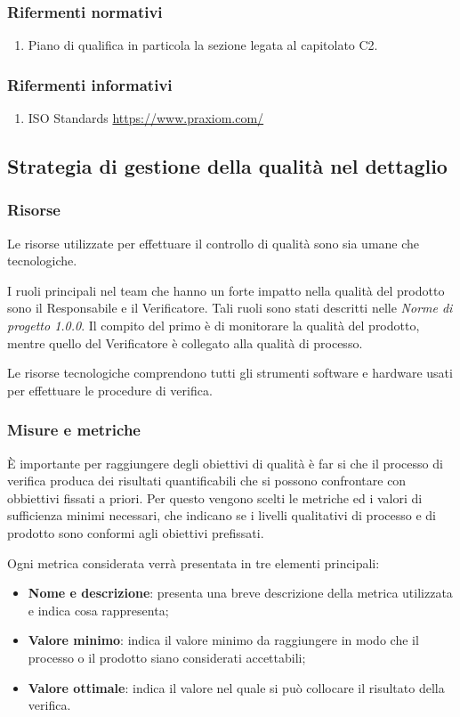 \subsubsection{Rifermenti normativi}
\begin{enumerate}
  \item Piano di qualifica in particola la sezione legata al capitolato C2.
\end{enumerate}
\subsubsection{Rifermenti informativi}
\begin{enumerate}
  \item ISO Standards
	\url{https://www.praxiom.com/}
\end{enumerate}
\subsection{Strategia di gestione della qualità nel dettaglio}
\subsubsection{Risorse}
Le risorse utilizzate per effettuare il controllo di qualità sono sia umane che tecnologiche.

I ruoli principali nel team che hanno un forte impatto nella qualità del prodotto sono il Responsabile e il Verificatore. Tali ruoli sono stati descritti nelle \textit{Norme di progetto 1.0.0}\docs. Il compito del primo è di monitorare la qualità del prodotto, mentre quello del Verificatore è collegato alla qualità di processo.

Le risorse tecnologiche comprendono tutti gli strumenti software e hardware usati per effettuare le procedure di verifica. 
\subsubsection{Misure e metriche}
\`{E} importante per raggiungere degli obiettivi di qualità è far si che il processo di verifica produca dei risultati quantificabili che si possono confrontare con obbiettivi fissati a priori. Per questo vengono scelti le metriche ed i valori di sufficienza minimi necessari, che indicano se i livelli qualitativi di processo e di prodotto sono conformi agli obiettivi prefissati.

Ogni metrica considerata verrà presentata in tre elementi principali:
\begin{itemize}
	\item \textbf{Nome e descrizione}: presenta una breve descrizione della metrica utilizzata e indica cosa rappresenta;
	\item \textbf{Valore minimo}: indica il valore minimo da raggiungere in modo che il processo o il prodotto siano considerati accettabili;
	\item \textbf{Valore ottimale}: indica il valore nel quale si può collocare il risultato della verifica.
\end{itemize}

